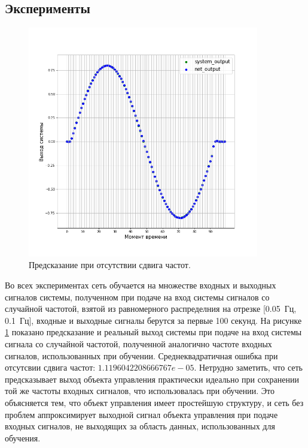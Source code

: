 \documentclass[12pt, oneside]{extbook}
\begin{document}
\begin{flushleft}
\section{Эксперименты}
\begin{figure}[h]
\centering
\includegraphics[width=0.9\textwidth]{fcnet_prediction}
\caption{Предсказание при отсутствии сдвига частот.}
\label{fig:multi_prediction}
\end{figure}
Во всех экспериментах сеть обучается на множестве входных и выходных сигналов системы, полученном при подаче на вход системы сигналов со случайной частотой, взятой из равномерного распределния на отрезке [0.05~Гц, 0.1~Гц], входные и выходные сигналы берутся за первые 100 секунд. На рисунке \ref{fig:multi_prediction} показано предсказание и реальный выход системы при подаче на вход системы сигнала со случайной частотой, полученной аналогично частоте входных сигналов, использованных при обучении. Среднеквадратичная ошибка при отсутсвии сдвига частот: 
$ 1.1196042208666767e-05$. Нетрудно заметить, что сеть предсказывает выход объекта управления практически идеально при сохранении той же частоты входных сигналов, что использовалась при обучении. Это объясняется тем, что объект управления имеет простейшую структуру, и сеть без проблем аппроксимирует выходной сигнал объекта управления при подаче входных сигналов, не выходящих за область данных, использованных для обучения.
\par
\begin{figure}[h]

\end{figure}
\end{flushleft}
\end{document}
